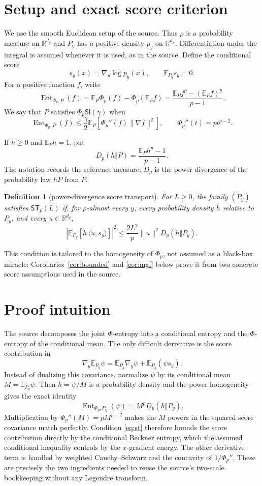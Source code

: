 \documentclass[11pt]{article}
\newtheorem{definition}[theorem]{Definition}
\theoremstyle{remark}
\newcommand{\E}{\mathbb E}
\newcommand{\R}{\mathbb R}
\newcommand{\Ent}{\operatorname{Ent}}
\newcommand{\norm}[1]{\lVert#1\rVert}
\newcommand{\ip}[2]{\langle#1,#2\rangle}
\newcommand{\phip}{\Phi_p}
\newcommand{\ST}{\mathsf{ST}_p}
\begin{document}
\section{Setup and exact score criterion}

We use the smooth Euclidean setup of the source.  Thus $\rho$ is a probability
measure on $\R^{d_y}$ and $P_y$ has a positive density $p_y$ on
$\R^{d_x}$.  Differentiation under the integral is assumed whenever it is
used, as in the source.  Define the conditional score
\[
  s_y(x)=\nabla_y\log p_y(x),
  \qquad \E_{P_y}s_y=0.
\]
For a positive function $f$, write
\[
 \Ent_{\phip,P}(f)
 =\E_P\phip(f)-\phip(\E_Pf)
 =\frac{\E_Pf^p-(\E_Pf)^p}{p-1}.
\]
We say that $P$ satisfies $\Phi_p\mathsf{SI}(\gamma)$ when
\begin{equation}
 \Ent_{\phip,P}(f)
 \leq \frac{\gamma}{2}\E_P\!\left[
   \phip''(f)\norm{\nabla f}^2\right],
 \qquad \phip''(t)=p t^{p-2}.
 \label{eq:phisi}
\end{equation}

If $h\geq0$ and $\E_Ph=1$, put
\[
 D_p(h\Vert P)=\frac{\E_Ph^p-1}{p-1}.
\]
The notation records the reference measure; $D_p$ is the power divergence of
the probability law $hP$ from $P$.

\begin{definition}[power-divergence score transport]
For $L\geq0$, the family $(P_y)$ satisfies $\ST(L)$ if, for $\rho$-almost
every $y$, every probability density $h$ relative to $P_y$, and every
$u\in\R^{d_y}$,
\begin{equation}
 \left|\E_{P_y}\!\left[h\,\ip{u}{s_y}\right]\right|^2
 \leq \frac{2L^2}{p}\norm{u}^2D_p(h\Vert P_y).
 \label{eq:st}
\end{equation}
\end{definition}

This condition is tailored to the homogeneity of $\phip$, not assumed as a
black-box miracle: Corollaries~\ref{cor:bounded} and \ref{cor:mgf} below prove
it from two concrete score assumptions used in the source.

\section{Proof intuition}

The source decomposes the joint $\Phi$-entropy into a conditional entropy and
the $\Phi$-entropy of the conditional mean.  The only difficult derivative is
the score contribution in
\[
 \nabla_y\E_{P_y}\psi
 =\E_{P_y}\nabla_y\psi+\E_{P_y}(\psi s_y).
\]
Instead of dualizing this covariance, normalize $\psi$ by its conditional
mean $M=\E_{P_y}\psi$.  Then $h=\psi/M$ is a probability density and the
power homogeneity gives the exact identity
\[
 \Ent_{\phip,P_y}(\psi)=M^pD_p(h\Vert P_y).
\]
Multiplication by $\phip''(M)=pM^{p-2}$ makes the $M$ powers in the squared
score covariance match perfectly.  Condition \eqref{eq:st} therefore bounds
the score contribution directly by the conditional Beckner entropy, which
the assumed conditional inequality controls by the $x$-gradient energy.
The other derivative term is handled by weighted Cauchy--Schwarz and the
concavity of $1/\phip''$.  These are precisely the two ingredients needed to
reuse the source's two-scale bookkeeping without any Legendre transform.
\end{document}
